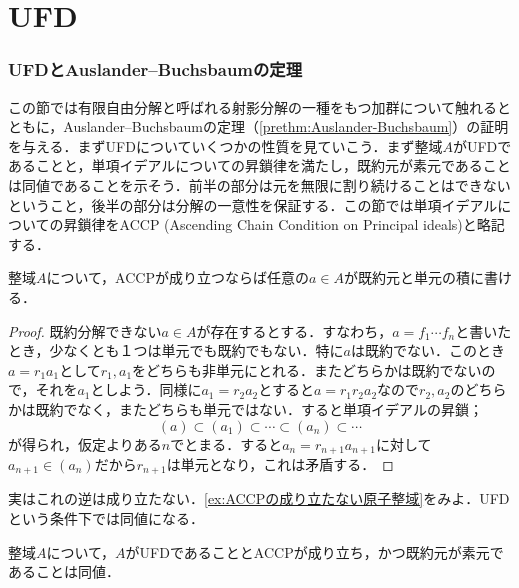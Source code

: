\part[Unique Factorisation Domain]{UFD}

\section{UFDとAuslander--Buchsbaumの定理}

この節では有限自由分解と呼ばれる射影分解の一種をもつ加群について触れるとともに，Auslander--Buchsbaumの定理（\ref{prethm:Auslander-Buchsbaum}）の証明を与える．まずUFDについていくつかの性質を見ていこう．まず整域$A$がUFDであることと，単項イデアルについての昇鎖律を満たし，既約元が素元であることは同値であることを示そう．前半の部分は元を無限に割り続けることはできないということ，後半の部分は分解の一意性を保証する．この節では単項イデアルについての昇鎖律をACCP (Ascending Chain Condition on Principal ideals)と略記する．

\begin{prop}
	整域$A$について，ACCPが成り立つならば任意の$a\in A$が既約元と単元の積に書ける．
\end{prop}

\begin{proof}
	既約分解できない$a\in A$が存在するとする．すなわち，$a=f_1\cdots f_n$と書いたとき，少なくとも１つは単元でも既約でもない．特に$a$は既約でない．このとき$a=r_1a_1$として$r_1,a_1$をどちらも非単元にとれる．またどちらかは既約でないので，それを$a_1$としよう．同様に$a_1=r_2a_2$とすると$a=r_1r_2a_2$なので$r_2,a_2$のどちらかは既約でなく，またどちらも単元ではない．すると単項イデアルの昇鎖；
	\[(a)\subset(a_1)\subset\cdots\subset(a_n)\subset\cdots\]
	が得られ，仮定よりある$n$でとまる．すると$a_n=r_{n+1}a_{n+1}$に対して$a_{n+1}\in(a_n)$だから$r_{n+1}$は単元となり，これは矛盾する．
\end{proof}

実はこれの逆は成り立たない．\ref{ex:ACCPの成り立たない原子整域}をみよ．UFDという条件下では同値になる．

\begin{prop}
	整域$A$について，$A$がUFDであることとACCPが成り立ち，かつ既約元が素元であることは同値．
\end{prop}

